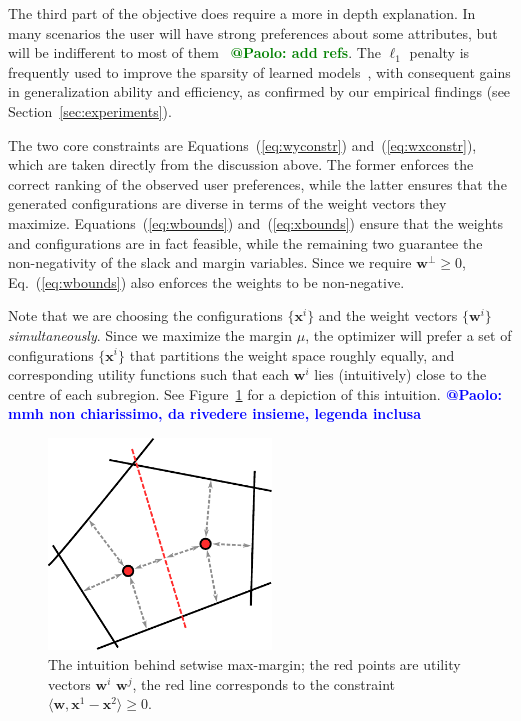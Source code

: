 \documentclass{article}
\renewcommand\[{\begin{equation}}
\renewcommand\]{\end{equation}}
\newcommand{\vecvar}[1]{\ensuremath{\boldsymbol{#1}}}
\newcommand{\vw}{\vecvar{w}}
\newcommand{\vx}{\vecvar{x}}
\newcommand{\andrea}[1]{{\bf \textcolor{blue}{{\fbox{Andrea:} #1}}}}
\newcommand{\stefano}[1]{{\bf \textcolor{green}{{\fbox{Stefano:} #1}}}}
\begin{document}
The third part of the objective does require a more in depth explanation. In
many scenarios the user will have strong preferences about some attributes, but
will be indifferent to most of them~\cite{} \stefano{@Paolo: add refs}. The $\ell_1$ penalty is frequently
used to improve the sparsity of learned models~\cite{lasso,zhang2008,Hensinger2010}, with consequent gains
in generalization ability and efficiency, as confirmed by our empirical
findings (see Section~\ref{sec:experiments}).

The two core constraints are Equations~(\ref{eq:wyconstr}) and~(\ref{eq:wxconstr}),
which are taken directly from the discussion above. The former enforces the
correct ranking of the observed user preferences, while the latter ensures that
the generated configurations are diverse in terms of the weight vectors they
maximize. Equations~(\ref{eq:wbounds}) and~(\ref{eq:xbounds})
ensure that the weights and configurations are in fact feasible, while the
remaining two guarantee the non-negativity of the slack and margin variables.
Since we require $\vw^\bot \ge 0$, Eq.~(\ref{eq:wbounds}) also enforces the
weights to be non-negative.

Note that we are choosing the configurations $\{ \vx^i \}$ and the weight vectors $\{
\vw^i \}$ {\em simultaneously}. Since we maximize the margin $\mu$, the optimizer
will prefer a set of configurations $\{ \vx^{i} \}$ that partitions the weight space
roughly equally, and corresponding utility functions such that each $\vw^{i}$
lies (intuitively) close to the centre of each subregion. See
Figure~\ref{fig:setmargin} for a depiction of this intuition.\andrea{@Paolo: mmh non chiarissimo, da rivedere insieme, legenda inclusa}

\begin{figure}[t]
    \begin{center}
        \includegraphics[width=16em]{figures/setmargin}
    \end{center}
    \caption{\label{fig:setmargin} The intuition behind setwise max-margin; the red points are utility vectors $\vw^{i}$ $\vw^{j}$, the red line corresponds to the constraint $\langle \vw, \vx^{1} - \vx^{2} \rangle \ge 0$.}
\end{figure}
\end{document}
